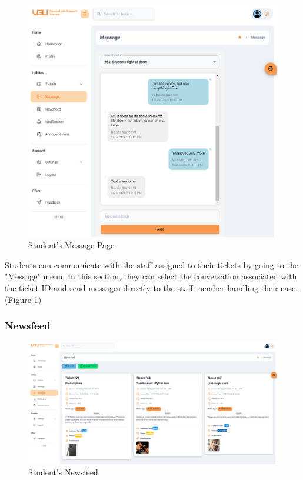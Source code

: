 	\begin{figure}[H]
		\centering
		\includegraphics[width=0.9\linewidth]{graphics/gui/student/msg}
		\caption{Student's Message Page}
		\label{fig:gui-std-msg}
	\end{figure}
	Students can communicate with the staff assigned to their tickets by going to the "Message" menu. In this section, they can select the conversation associated with the ticket ID and send messages directly to the staff member handling their case. (Figure \ref{fig:gui-std-msg})
	

	
	
	
	\subsubsection{Newsfeed}
	\begin{figure}[H]
		\centering
		\includegraphics[width=1.0\linewidth]{graphics/gui/student/newsfeed}
		\caption{Student's Newsfeed}
		\label{fig:gui-std-newsfeed}
	\end{figure}
	
